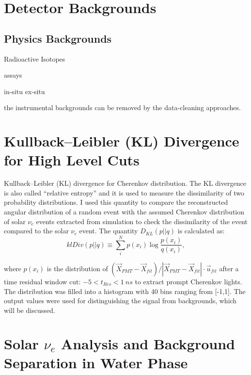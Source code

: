 
\section{Detector Backgrounds}

\subsection{Physics Backgrounds}

Radioactive Isotopes

assays


in-situ
ex-situ

the instrumental backgrounds can be removed by the data-cleaning approaches.



\section{Kullback–Leibler (KL) Divergence for High Level Cuts}

Kullback–Leibler (KL) divergence for Cherenkov distribution. The KL divergence is also called ``relative entropy'' and it is used to measure the dissimilarity of two probability distributions\cite{murphy2012machine}. I used this quantity to compare the reconstructed angular distribution of a random event with the assumed Cherenkov distribution of solar $\nu_e$ events extracted from simulation to check the dissimilarity of the event compared to the solar $\nu_e$ event. The quantity $D_{KL}(p||q)$ is calculated as: 
\begin{equation}\label{kldiv}
klDiv(p||q) \equiv \sum_{i}^N p(x_i)\log{\frac{p(x_i)}{q(x_i)}},
\end{equation}

where $p(x_i)$ is the distribution of $(\vec{X}_{PMT}-\vec{X}_{fit})/|\vec{X}_{PMT}-\vec{X}_{fit}|\cdot\vec{u}_{fit}$ after a time residual window cut: $-5<t_{Res}<1~ns$ to extract prompt Cherenkov lights. The distribution was filled into a histogram with 40 bins ranging from [-1,1]. The output values were used for distinguishing the signal from backgrounds, which will be discussed.

\section{Solar \texorpdfstring{$\nu_e$}{Lg} Analysis and Background Separation in Water Phase}
